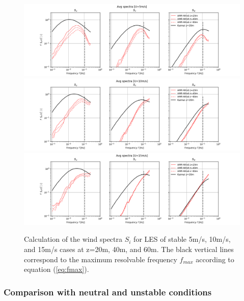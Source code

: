 \begin{figure}[hbt!]
  \label{fig:ABLSpectra_AllZ}
  \centering
  \includegraphics[width=7.0in]{figures/Stable_Spectra_AllZ_05ms.png}\\
  \includegraphics[width=7.0in]{figures/Stable_Spectra_AllZ_10ms.png}\\
  \includegraphics[width=7.0in]{figures/Stable_Spectra_AllZ_15ms.png}
  \caption{Calculation of the wind spectra $S_i$ for LES of stable
    5m/s, 10m/s, and 15m/s cases at z=20m, 40m, and 60m.  The black
    vertical lines correspond to the maximum resolvable frequency
    $f_{max}$ according to equation (\ref{eq:fmax}). }
\end{figure}


\subsubsection{Comparison with neutral and unstable conditions}


